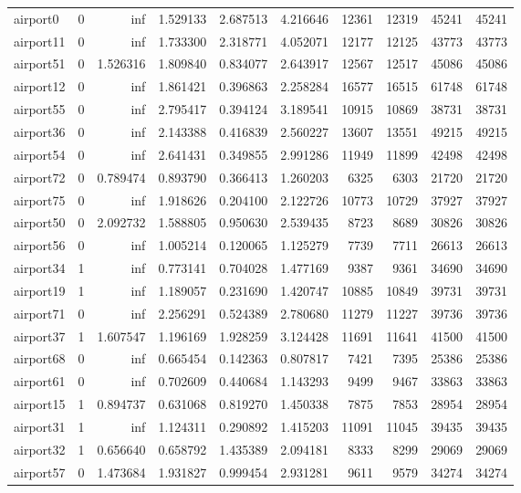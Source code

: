 \begin{longtable}{|l|r|r|r|r|r|r|r|r|r|}
airport0 & 0 & inf & 1.529133 & 2.687513 & 4.216646 & 12361 & 12319 & 45241 & 45241 \\
airport11 & 0 & inf & 1.733300 & 2.318771 & 4.052071 & 12177 & 12125 & 43773 & 43773 \\
airport51 & 0 & 1.526316 & 1.809840 & 0.834077 & 2.643917 & 12567 & 12517 & 45086 & 45086 \\
airport12 & 0 & inf & 1.861421 & 0.396863 & 2.258284 & 16577 & 16515 & 61748 & 61748 \\
airport55 & 0 & inf & 2.795417 & 0.394124 & 3.189541 & 10915 & 10869 & 38731 & 38731 \\
airport36 & 0 & inf & 2.143388 & 0.416839 & 2.560227 & 13607 & 13551 & 49215 & 49215 \\
airport54 & 0 & inf & 2.641431 & 0.349855 & 2.991286 & 11949 & 11899 & 42498 & 42498 \\
airport72 & 0 & 0.789474 & 0.893790 & 0.366413 & 1.260203 & 6325 & 6303 & 21720 & 21720 \\
airport75 & 0 & inf & 1.918626 & 0.204100 & 2.122726 & 10773 & 10729 & 37927 & 37927 \\
airport50 & 0 & 2.092732 & 1.588805 & 0.950630 & 2.539435 & 8723 & 8689 & 30826 & 30826 \\
airport56 & 0 & inf & 1.005214 & 0.120065 & 1.125279 & 7739 & 7711 & 26613 & 26613 \\
airport34 & 1 & inf & 0.773141 & 0.704028 & 1.477169 & 9387 & 9361 & 34690 & 34690 \\
airport19 & 1 & inf & 1.189057 & 0.231690 & 1.420747 & 10885 & 10849 & 39731 & 39731 \\
airport71 & 0 & inf & 2.256291 & 0.524389 & 2.780680 & 11279 & 11227 & 39736 & 39736 \\
airport37 & 1 & 1.607547 & 1.196169 & 1.928259 & 3.124428 & 11691 & 11641 & 41500 & 41500 \\
airport68 & 0 & inf & 0.665454 & 0.142363 & 0.807817 & 7421 & 7395 & 25386 & 25386 \\
airport61 & 0 & inf & 0.702609 & 0.440684 & 1.143293 & 9499 & 9467 & 33863 & 33863 \\
airport15 & 1 & 0.894737 & 0.631068 & 0.819270 & 1.450338 & 7875 & 7853 & 28954 & 28954 \\
airport31 & 1 & inf & 1.124311 & 0.290892 & 1.415203 & 11091 & 11045 & 39435 & 39435 \\
airport32 & 1 & 0.656640 & 0.658792 & 1.435389 & 2.094181 & 8333 & 8299 & 29069 & 29069 \\
airport57 & 0 & 1.473684 & 1.931827 & 0.999454 & 2.931281 & 9611 & 9579 & 34274 & 34274 \\

\end{longtable}

